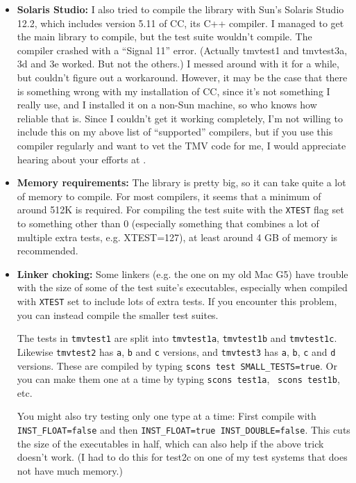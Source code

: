 \begin{itemize}
\item {\bf Solaris Studio:}
I also tried to compile the library with Sun's Solaris Studio 12.2, which includes
version 5.11 of CC, its C++ compiler.
I managed to get the main library to compile, but the test suite wouldn't compile.
The compiler crashed with a ``Signal 11'' error.  
(Actually tmvtest1 and tmvtest3a, 3d and 3e worked.  But not the others.)
I messed around with it for a 
while, but couldn't figure out a workaround.  However, it may be the case that 
there is something wrong with my installation of CC, since it's not something
I really use, and I installed it on a non-Sun machine, so who knows how reliable 
that is.  Since I couldn't get it working completely,
I'm not willing to include this on my above list of ``supported'' compilers,
but if you use this compiler regularly and want to vet the TMV code for me, I would 
appreciate hearing about your efforts at  \mygroup.

\item {\bf Memory requirements:}
The library is pretty big, so it can take quite a lot of memory to compile. 
For most compilers, it seems that a minimum of around 512K is required.
For compiling the test suite with the \texttt{XTEST} flag set to something other than 0 (especially something that combines a lot of multiple extra tests, e.g. XTEST=127), at least around 4 GB of memory is recommended.

\item {\bf Linker choking:}
Some linkers (e.g. the one on my old Mac G5) have trouble with the size 
of some of the test suite's executables, especially when compiled 
with \texttt{XTEST} set to include lots of extra tests.  If you encounter this problem, you can instead
compile the smaller test suites.  

The tests
in \texttt{tmvtest1} are split into \texttt{tmvtest1a}, \texttt{tmvtest1b} and \texttt{tmvtest1c}.
Likewise \texttt{tmvtest2} has \texttt{a}, \texttt{b} and \texttt{c} versions, and \texttt{tmvtest3}
has \texttt{a}, \texttt{b}, \texttt{c} and \texttt{d} versions.  These are 
compiled by typing \texttt{scons test SMALL\_TESTS=true}.  Or you can make them one
at a time by typing \texttt{scons test1a},~ \texttt{scons test1b}, etc.

You might also try testing only one type at a time: First compile with \texttt{INST\_FLOAT=false}
and then \texttt{INST\_FLOAT=true INST\_DOUBLE=false}.  This cuts the size of the executables
in half, which can also help if the above trick doesn't work.  (I had to do this for test2c on one 
of my test systems that does not have much memory.)


\end{itemize}
